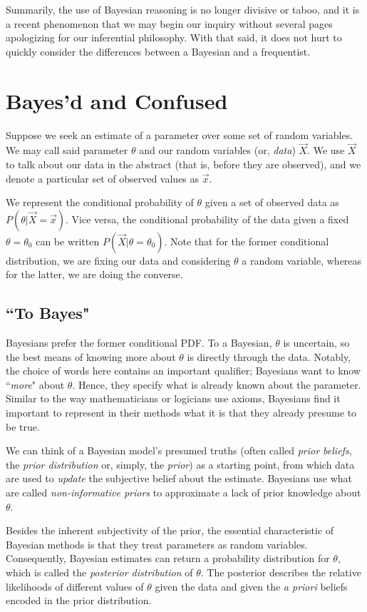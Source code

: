 \documentclass[12pt,twoside]{reedthesis}
\begin{document}
	Summarily, the use of Bayesian reasoning is no longer divisive or taboo, and it is a recent phenomenon that we may begin our inquiry without several pages apologizing for our inferential philosophy. With that said, it does not hurt to quickly consider the differences between a Bayesian and a frequentist. 
		
\section{Bayes'd and Confused}

	Suppose we seek an estimate of a parameter over some set of random variables. We may call said parameter $\theta$ and our random variables (or, {\em data}) $\vec{X}$. We use $\vec{X}$ to talk about our data in the abstract (that is, before they are observed), and we denote a particular set of observed values as $\vec{x}$. 

	We represent the conditional probability of $\theta$ given a set of observed data as $P(\theta | \vec{X} = \vec{x})$. Vice versa, the conditional probability of the data given a fixed $\theta = \theta_0$ can be written $P(\vec{X} | \theta = \theta_0)$. Note that for the former conditional distribution, we are fixing our data and considering $\theta$ a random variable, whereas for the latter, we are doing the converse.

	\subsection*{``To Bayes"}
	Bayesians prefer the former conditional PDF. To a Bayesian, $\theta$ is uncertain, so the best means of knowing more about $\theta$ is directly through the data. Notably, the choice of words here contains an important qualifier; Bayesians want to know ``{\em more}" about $\theta$. Hence, they specify what is already known about the parameter. Similar to the way mathematicians or logicians use axioms, Bayesians find it important to represent in their methods what it is that they already presume to be true.
	
	We can think of a Bayesian model's presumed truths (often called {\em prior beliefs}, the {\em prior distribution} or, simply, the {\em prior}) as a starting point, from which data are used to {\em update} the subjective belief about the estimate.  Bayesians use what are called {\em non-informative priors} to approximate a lack of prior knowledge about $\theta$. 
	
	Besides the inherent subjectivity of the prior, the essential characteristic of Bayesian methods is that they treat parameters as random variables. Consequently, Bayesian estimates can return a probability distribution for $\theta$, which is called the {\em posterior distribution} of $\theta$. The posterior describes the relative likelihoods of different values of $\theta$ given the data and given the {\em a priori} beliefs encoded in the prior distribution.
\end{document}
